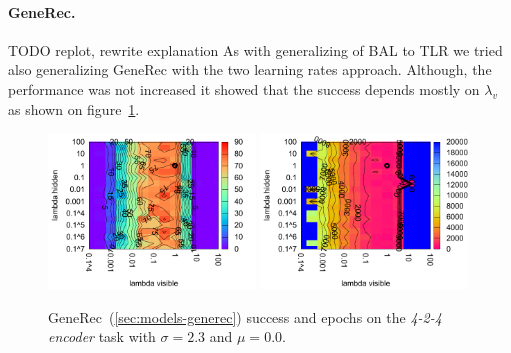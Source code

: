 \paragraph{GeneRec.} 
TODO replot, rewrite explanation 
As with generalizing of BAL to TLR we tried also generalizing GeneRec with the two learning rates approach. Although, the performance was not increased it showed that the success depends mostly on $\lambda_v$ as shown on figure~\ref{fig:results-generec-auto4-performance}. 
\begin{figure}[H]
  \centering
  \includegraphics[width=0.49\textwidth]{img/generec-auto4-success.pdf}   
  \includegraphics[width=0.49\textwidth]{img/generec-auto4-epoch.pdf}     
  \caption{GeneRec~(\ref{sec:models-generec}) success and epochs on the \emph{4-2-4 encoder} task with $\sigma = 2.3$ and $\mu = 0.0$.}
  \label{fig:results-generec-auto4-performance}
\end{figure}


